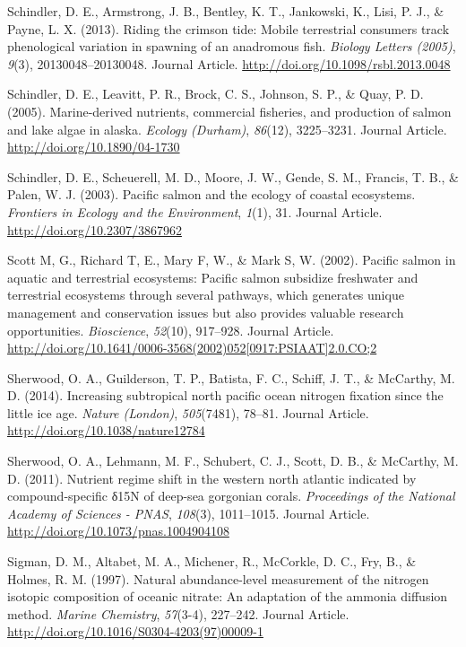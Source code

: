 \documentclass [11pt, proquest] {uwthesis}[2015/03/03]
\begin{document}
\hypertarget{ref-Schindler2013}{}
Schindler, D. E., Armstrong, J. B., Bentley, K. T., Jankowski, K., Lisi,
P. J., \& Payne, L. X. (2013). Riding the crimson tide: Mobile
terrestrial consumers track phenological variation in spawning of an
anadromous fish. \emph{Biology Letters (2005)}, \emph{9}(3),
20130048--20130048. Journal Article.
\url{http://doi.org/10.1098/rsbl.2013.0048}

\hypertarget{ref-Schindler2005}{}
Schindler, D. E., Leavitt, P. R., Brock, C. S., Johnson, S. P., \& Quay,
P. D. (2005). Marine-derived nutrients, commercial fisheries, and
production of salmon and lake algae in alaska. \emph{Ecology (Durham)},
\emph{86}(12), 3225--3231. Journal Article.
\url{http://doi.org/10.1890/04-1730}

\hypertarget{ref-Schindler2003}{}
Schindler, D. E., Scheuerell, M. D., Moore, J. W., Gende, S. M.,
Francis, T. B., \& Palen, W. J. (2003). Pacific salmon and the ecology
of coastal ecosystems. \emph{Frontiers in Ecology and the Environment},
\emph{1}(1), 31. Journal Article. \url{http://doi.org/10.2307/3867962}

\hypertarget{ref-Gende2002}{}
Scott M, G., Richard T, E., Mary F, W., \& Mark S, W. (2002). Pacific
salmon in aquatic and terrestrial ecosystems: Pacific salmon subsidize
freshwater and terrestrial ecosystems through several pathways, which
generates unique management and conservation issues but also provides
valuable research opportunities. \emph{Bioscience}, \emph{52}(10),
917--928. Journal Article.
\href{http://doi.org/10.1641/0006-3568(2002)052\%5B0917:PSIAAT\%5D2.0.CO;2}{http://doi.org/10.1641/0006-3568(2002)052{[}0917:PSIAAT{]}2.0.CO;2}

\hypertarget{ref-Sherwood2014}{}
Sherwood, O. A., Guilderson, T. P., Batista, F. C., Schiff, J. T., \&
McCarthy, M. D. (2014). Increasing subtropical north pacific ocean
nitrogen fixation since the little ice age. \emph{Nature (London)},
\emph{505}(7481), 78--81. Journal Article.
\url{http://doi.org/10.1038/nature12784}

\hypertarget{ref-Sherwood2011}{}
Sherwood, O. A., Lehmann, M. F., Schubert, C. J., Scott, D. B., \&
McCarthy, M. D. (2011). Nutrient regime shift in the western north
atlantic indicated by compound-specific δ15N of deep-sea gorgonian
corals. \emph{Proceedings of the National Academy of Sciences - PNAS},
\emph{108}(3), 1011--1015. Journal Article.
\url{http://doi.org/10.1073/pnas.1004904108}

\hypertarget{ref-Sigman1997}{}
Sigman, D. M., Altabet, M. A., Michener, R., McCorkle, D. C., Fry, B.,
\& Holmes, R. M. (1997). Natural abundance-level measurement of the
nitrogen isotopic composition of oceanic nitrate: An adaptation of the
ammonia diffusion method. \emph{Marine Chemistry}, \emph{57}(3-4),
227--242. Journal Article.
\url{http://doi.org/10.1016/S0304-4203(97)00009-1}
\end{document}
